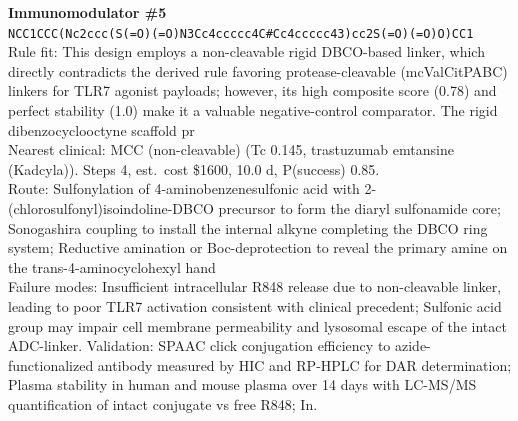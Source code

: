 \documentclass[10pt]{article}
\begin{document}
\noindent\textbf{Immunomodulator \#5} \\ \texttt{NCC1CCC(Nc2ccc(S(=O)(=O)N3Cc4ccccc4C\#Cc4ccccc43)cc2S(=O)(=O)O)CC1} \\ Rule fit: This design employs a non-cleavable rigid DBCO-based linker, which directly contradicts the derived rule favoring protease-cleavable (mcValCitPABC) linkers for TLR7 agonist payloads; however, its high composite score (0.78) and perfect stability (1.0) make it a valuable negative-control comparator. The rigid dibenzocyclooctyne scaffold pr \\ Nearest clinical: MCC (non-cleavable) (Tc 0.145, trastuzumab emtansine (Kadcyla)). Steps 4, est.\ cost \$1600, 10.0 d, P(success) 0.85. \\ Route: Sulfonylation of 4-aminobenzenesulfonic acid with 2-(chlorosulfonyl)isoindoline-DBCO precursor to form the diaryl sulfonamide core; Sonogashira coupling to install the internal alkyne completing the DBCO ring system; Reductive amination or Boc-deprotection to reveal the primary amine on the trans-4-aminocyclohexyl hand \\ Failure modes: Insufficient intracellular R848 release due to non-cleavable linker, leading to poor TLR7 activation consistent with clinical precedent; Sulfonic acid group may impair cell membrane permeability and lysosomal escape of the intact ADC-linker. Validation: SPAAC click conjugation efficiency to azide-functionalized antibody measured by HIC and RP-HPLC for DAR determination; Plasma stability in human and mouse plasma over 14 days with LC-MS/MS quantification of intact conjugate vs free R848; In. \\[0.4em]
\end{document}
